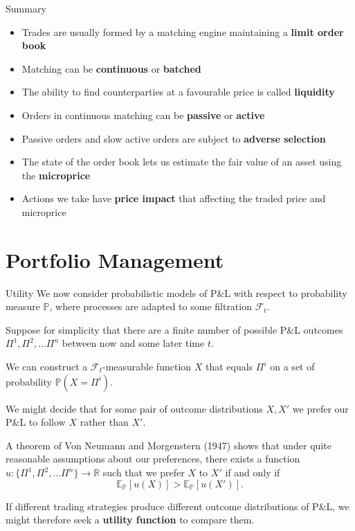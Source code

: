 \documentclass{beamer}
\newcommand{\sectionquote}[1]{\def\insertsquote{#1}}
\newcommand{\insertsquote}{}
\renewcommand{\insertsquote}{}
\begin{document}
\begin{frame}{Summary}
	\begin{itemize}
		\item Trades are usually formed by a matching engine maintaining a \textbf{limit order book}
		\item Matching can be \textbf{continuous} or \textbf{batched}
		\item The ability to find counterparties at a favourable price is called \textbf{liquidity}
		\item Orders in continuous matching can be \textbf{passive} or \textbf{active}
		\item Passive orders and slow active orders are subject to \textbf{adverse selection}
		\item The state of the order book lets us estimate the fair value of an asset using the \textbf{microprice}
		\item Actions we take have \textbf{price impact} that affecting the traded price and microprice
	\end{itemize}
\end{frame}

\sectionquote{``Cars have brakes so you can drive faster.'' Ben Rady}
\section{Portfolio Management}
\begin{frame}{Utility}
	We now consider probabilistic models of P\&L with respect to probability measure $\mathbb{P}$, where processes are adapted to some filtration $\mathcal{F}_t$.

	Suppose for simplicity that there are a finite number of possible P\&L outcomes $\Pi^1,\Pi^2,\ldots\Pi^n$ between now and some later time $t$.

	We can construct a $\mathcal{F}_t$-measurable function $X$ that equals $\Pi^i$ on a set of probability $\mathbb{P}(X=\Pi^i)$.%

	We might decide that for some pair of outcome distributions $X,X'$ we prefer our P\&L to follow $X$ rather than $X'$.

	A theorem of Von Neumann and Morgenstern (1947) shows that under quite reasonable assumptions about our preferences, there exists a function $u:\{\Pi^1,\Pi^2,\ldots \Pi^n\}\to\mathbb{R}$ such that we prefer $X$ to $X'$ if and only if%
	$$\mathbb{E}_\mathbb{P}[u(X)] > \mathbb{E}_\mathbb{P}[u(X')].$$

	If different trading strategies produce different outcome distributions of P\&L, we might therefore seek a \textbf{utility function} to compare them.
\end{frame}
\end{document}
